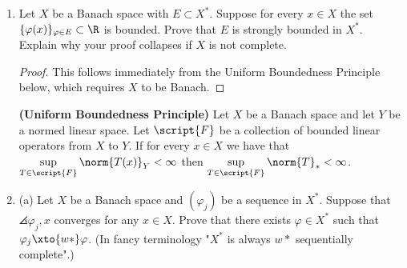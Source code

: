 \documentclass[12pt,letterpaper]{article}
\renewcommand{\phi}{\varphi}
\begin{document}
\begin{enumerate}
\begin{proof}
\begin{enumerate}[label=(\alph*)]
\begin{enumerate}[label=(\roman*)]
		\textsc{Claim:} $\sum_n\abs{f_n}<\infty$. To see this, suppose for contradiction that $\sum_n\abs{f_n}=\infty$. We know that $\norm{\sum\limits_{n=1}^N e_n}_{c_0}=1$ for every $N\in \N$, so 
		\begin{equation}\tag{$*$}
		\left\lbrace \sum\limits_{n=1}^N e_n : N\in \N\right\rbrace \subset \left\lbrace	x\in c_0 : \norm{x}\leq 1\right\rbrace.
		\end{equation}
		Thus 
		\begin{align*}
		\infty &= \sum_{n=1}^\infty\abs{f_n}\\
		&= \sup_N \sum_{n=1}^N\abs{f_n\cdot 1} \\
		&= \sup_N \sum_{n=1}^N\abs{\phi(e_n)} \\
		&\leq \sup_N \abs{\phi\left(\sum_{n=1}^N e_n\right)} & \text{by }\Delta\text{ ineq. and linearity}\\
		&\leq \sup_{\norm{x}=1}\abs{\phi(x)} &\qquad \text{by }(*)\\\
		&= \norm{\phi}_* \\
		&< \infty.
		\end{align*}
		Thus we have shown by contradiction that $\sum_n\abs{f_n}<\infty$. \qedhere
		\end{enumerate}
	\end{enumerate}
\end{proof}

\setcounter{enumi}{1}
\item Let $X$ be a Banach space with $E\subset X^*$. Suppose for every $x\in X$ the set $\{\phi(x)\}_{\phi\in E}\subset \R$ is bounded. Prove that $E$ is strongly bounded in $X^*$. Explain why your proof collapses if $X$ is not complete. 

\begin{proof}
This follows immediately from the Uniform Boundedness Principle below, which requires $X$ to be Banach. 
\end{proof}

\begin{theorem*}\textbf{(Uniform Boundedness Principle)}
Let $X$ be a Banach space and let $Y$ be a normed linear space. Let $\script{F}$ be a collection of bounded linear operators from $X$ to $Y$. If for every $x\in X$ we have that $\sup\limits_{T\in \script{F}}\norm{T(x)}_Y<\infty$ then $\sup\limits_{T\in\script{F}}\norm{T}_*<\infty$. 
\end{theorem*}

\pagebreak
\item (a) Let $X$ be a Banach space and $(\phi_j)$ be a sequence in $X^*$. Suppose that $\angles{\phi_j , x}$ converges for any $x \in X$. Prove that there exists $\phi \in X^*$ such that
$\phi_j \xto{w*} \phi$. (In fancy terminology "$X^*$ is always $w*$ sequentially complete".)


\end{enumerate}
\end{document}
